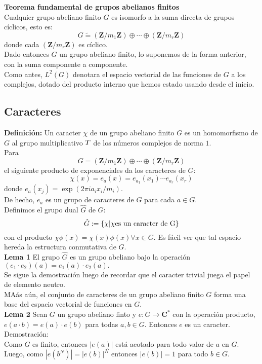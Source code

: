 \documentclass[a4paper,openright,10pt]{article}
\begin{document}
\textbf{Teorema fundamental de grupos abelianos finitos}\\
Cualquier grupo abeliano finito $G$ es isomorfo a la suma directa de grupos c\'iclicos, esto es: $$
G \tilde{=} (\mathbf{Z}/m_{1}\mathbf{Z})\oplus \cdots \oplus(\mathbf{Z}/m_{r}\mathbf{Z})
$$ donde cada $(\mathbf{Z}/m_{r}\mathbf{Z})$ es c\'iclico.\\

Dado entonces $G$ un grupo abeliano finito, lo suponemos de la forma anterior, con la suma componente a componente.\\ 
Como antes, $L^{2}(G)$ denotara el espacio vectorial de las funciones de $G$ a los complejos, dotado del producto interno que hemos estado usando desde el inicio.\\

\subsection{Caracteres} 
\textbf{Definici\'on:} \textsf{Un caracter} $\chi$ de un grupo abeliano finito $G$ es un homomorfismo de $G$ al grupo multiplicativo $\boldmath T$ de los n\'umeros complejos de norma $1.$\\
Para $$
G = (\mathbf{Z}/m_{1}\mathbf{Z})\oplus \cdots \oplus(\mathbf{Z}/m_{r}\mathbf{Z})
$$ el siguiente producto de exponenciales da los caracteres de $G:$ $$
\chi (x)=e_{a}(x)=e_{a_{1}}(x_{1})\cdots e_{a_{r}}(x_{r})
$$ donde $e_{a_{}}(x_{j})=\exp(2\pi ia_{i}x_{i}/m_{i}).$\\ 
De hecho, $e_{a}$ es un grupo de caracteres de $G$ para cada $a \in G.$\\
Definimos el grupo dual $\hat{G}$ de $G:$
$$
\hat{G}:=\{\chi | \chi \textnormal{es un caracter de G}\}
$$ con el producto $\chi \phi (x)=\chi(x) \phi (x) \forall x\in G.$ Es f\'acil ver que tal espacio hereda la estructura conmutativa de $G.$\\
\textbf{Lema 1} El grupo $\hat{G}$ es un grupo abeliano bajo la operaci\'on $
(e_{1}\cdot e_{2})(a)=e_{1}(a)\cdot e_{2}(a).$\\
Se sigue la demostraci\'on luego de recordar que el caracter trivial juega el papel de elemento neutro.\\
MA\'as a\'un, el conjunto de caracteres de un grupo abeliano finito $G$ forma una base del espacio vectorial de funciones en $G.$\\
\textbf{Lema 2} Sean $G$  un grupo abeliano finto y $e: G\rightarrow \mathbf{C}^{*}$ con la operaci\'on producto, $e(a\cdot b)=e(a)\cdot e(b)$ para todas $a,b \in G.$ Entonces $e$ es un caracter. \\
Demostraci\'on: \\
Como $G$ es finito, entonces $|e(a)|$ est\'a acotado para todo valor de $a$ en $G.$ Luego, como
$|e(b^{N})|=|e(b)|^{N}$ entonces $|e(b)|=1$ para todo $b \in G.$\\
\end{document}
